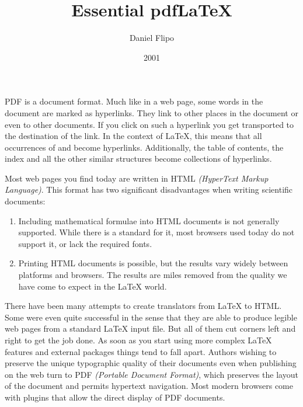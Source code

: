 \documentclass[twoside,11pt,letterpaper]{article}
\begin{document}

\title{Essential pdf\LaTeX} 
\author{Daniel Flipo}
\date{2001}
\maketitle

\label{sec:pdftex}
%
PDF is a  document format. Much like in a web page,
some words in the document are marked as hyperlinks. They link to other
places in the document or even to other documents. If you click
on such a hyperlink you get transported to the destination of the
link. In the context of \LaTeX{}, this means that all occurrences of
 and  become hyperlinks. Additionally, the table
of contents, the index and all the other similar structures become
collections of hyperlinks.

Most web pages you find today are written in HTML \emph{(HyperText
  Markup Language)}. This format has two significant disadvantages
when writing scientific documents:
\begin{enumerate}
\item Including mathematical formulae into HTML documents is not
  generally supported. While there is a standard for it, most browsers
  used today do not support it, or lack the required fonts.
\item Printing HTML documents is possible, but the results vary widely
  between platforms and browsers. The results are miles removed from
  the quality we have come to expect in the \LaTeX{} world.
\end{enumerate}

There have been many attempts to create translators from \LaTeX{} to
HTML. Some were even quite successful in the sense that they are able
to produce legible web pages from a standard \LaTeX{} input file. But
all of them cut corners left and right to get the job done. As soon as
you start using more complex \LaTeX{} features and external packages
things tend to fall apart. Authors wishing to preserve the unique
typographic quality of their documents even when publishing on the web
turn to PDF \emph{(Portable Document Format)}, which preserves the 
layout of the document and permits hypertext
navigation. Most modern browsers come with plugins that allow the
direct display of PDF documents.
\end{document}
